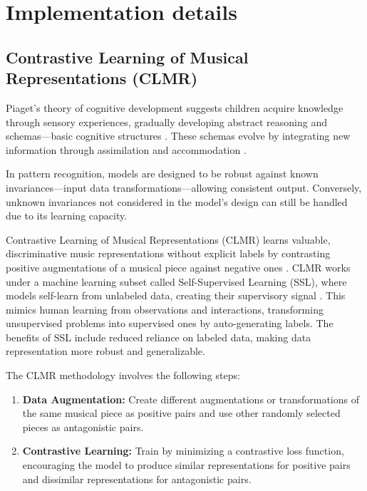 \section{Implementation details}
\subsection{Contrastive Learning of Musical Representations (CLMR)}

Piaget's theory of cognitive development suggests children acquire knowledge through sensory experiences, gradually developing abstract reasoning and schemas—basic cognitive structures \cite{Huitt2003PiagetsDevelopment}. These schemas evolve by integrating new information through assimilation and accommodation \cite{audioselfsupsurvey}.

In pattern recognition, models are designed to be robust against known invariances—input data transformations—allowing consistent output. Conversely, unknown invariances not considered in the model's design can still be handled due to its learning capacity.

Contrastive Learning of Musical Representations (CLMR) learns valuable, discriminative music representations without explicit labels by contrasting positive augmentations of a musical piece against negative ones \cite{CLMR2021}. CLMR works under a machine learning subset called Self-Supervised Learning (SSL), where models self-learn from unlabeled data, creating their supervisory signal \cite{audioselfsupsurvey}. This mimics human learning from observations and interactions, transforming unsupervised problems into supervised ones by auto-generating labels. The benefits of SSL include reduced reliance on labeled data, making data representation more robust and generalizable.

The CLMR methodology involves the following steps:

\begin{enumerate}
\item \textbf{Data Augmentation:} Create different augmentations or transformations of the same musical piece as positive pairs and use other randomly selected pieces as antagonistic pairs.
\item \textbf{Contrastive Learning:} Train by minimizing a contrastive loss function, encouraging the model to produce similar representations for positive pairs and dissimilar representations for antagonistic pairs.
\end{enumerate}


